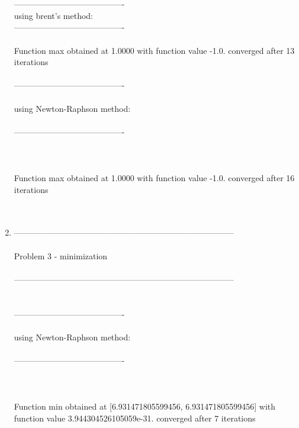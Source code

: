 \documentclass[12pt]{article}
\begin{document}
\begin{enumerate}
		\\\\
		----------------------------------------
		\\using brent's method: \\
		----------------------------------------
		\\\\
		Function max obtained at 1.0000 with function value -1.0. converged after 13 iterations \\
		\\ ---------------------------------------- \\
		\\     using Newton-Raphson method:   \\
		\\ ---------------------------------------- \\
		\\  \\
		\\ Function max obtained at 1.0000 with function value -1.0. converged after 16 iterations \\
		\\  \\
	\item 
		-------------------------------------------------------------------------------- \\
		\\     Problem 3 - minimization  \\
		\\ -------------------------------------------------------------------------------- \\
		\\ 
		\\ ---------------------------------------- \\
		\\     using Newton-Raphson method:   \\
		\\ ---------------------------------------- \\
		\\  \\
		\\ Function min obtained at [6.931471805599456, 6.931471805599456] with function value 3.944304526105059e-31. converged after 7 iterations \\
		\\  \\
\end{enumerate} 
\end{document}
